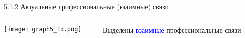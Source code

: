 \begin{frame}{5.1.2 Актуальные профессиональные (взаимные) связи}

\begin{columns}[T] %
\begin{column}{0.8\textwidth} %
\centering
          \texttt{[image: graph5\_1b.png]}
\end{column}
\begin{column}{0.2\textwidth} %

Выделены \textcolor{blue}{взаимные} профессиональные связи

\end{column}
\end{columns}
\end{frame}


